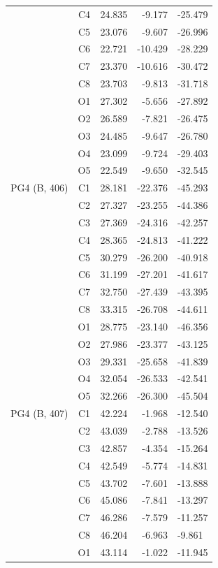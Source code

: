 \begin{longtable}{@{}lcrr@{}}
   & C4 & 24.835 & -9.177 & -25.479 \\
   & C5 & 23.076 & -9.607 & -26.996 \\
   & C6 & 22.721 & -10.429 & -28.229 \\
   & C7 & 23.370 & -10.616 & -30.472 \\
   & C8 & 23.703 & -9.813 & -31.718 \\
   & O1 & 27.302 & -5.656 & -27.892 \\
   & O2 & 26.589 & -7.821 & -26.475 \\
   & O3 & 24.485 & -9.647 & -26.780 \\
   & O4 & 23.099 & -9.724 & -29.403 \\
   & O5 & 22.549 & -9.650 & -32.545 \\
  \cmidrule(r){1-5}
  PG4 (B, 406) & C1 & 28.181 & -22.376 & -45.293 \\
   & C2 & 27.327 & -23.255 & -44.386 \\
   & C3 & 27.369 & -24.316 & -42.257 \\
   & C4 & 28.365 & -24.813 & -41.222 \\
   & C5 & 30.279 & -26.200 & -40.918 \\
   & C6 & 31.199 & -27.201 & -41.617 \\
   & C7 & 32.750 & -27.439 & -43.395 \\
   & C8 & 33.315 & -26.708 & -44.611 \\
   & O1 & 28.775 & -23.140 & -46.356 \\
   & O2 & 27.986 & -23.377 & -43.125 \\
   & O3 & 29.331 & -25.658 & -41.839 \\
   & O4 & 32.054 & -26.533 & -42.541 \\
   & O5 & 32.266 & -26.300 & -45.504 \\
  \cmidrule(r){1-5}
  PG4 (B, 407) & C1 & 42.224 & -1.968 & -12.540 \\
   & C2 & 43.039 & -2.788 & -13.526 \\
   & C3 & 42.857 & -4.354 & -15.264 \\
   & C4 & 42.549 & -5.774 & -14.831 \\
   & C5 & 43.702 & -7.601 & -13.888 \\
   & C6 & 45.086 & -7.841 & -13.297 \\
   & C7 & 46.286 & -7.579 & -11.257 \\
   & C8 & 46.204 & -6.963 & -9.861 \\
   & O1 & 43.114 & -1.022 & -11.945 \\

\end{longtable}
